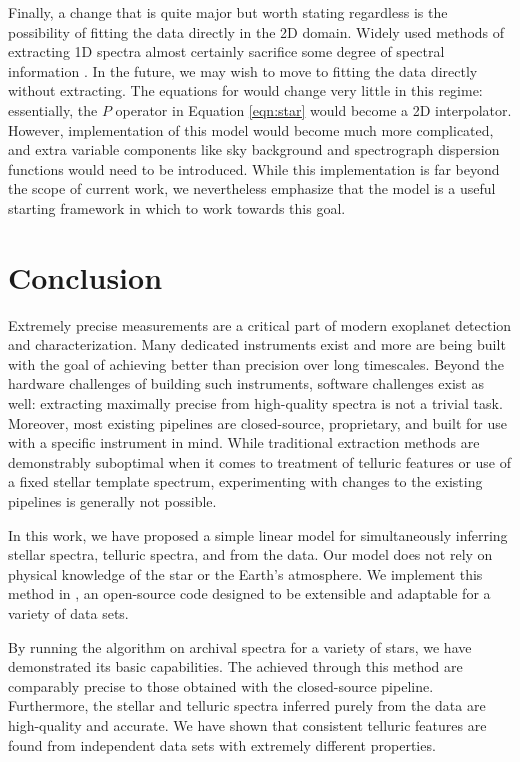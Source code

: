 \documentclass[modern]{aastex62}
\begin{document}
{Finally, a change that is quite major but worth stating regardless is the possibility of fitting the data directly in the 2D domain. 
Widely used methods of extracting 1D spectra almost certainly sacrifice some degree of spectral information \citep{Bolton2010}.
In the future, we may wish to move to fitting the data directly without extracting. 
The equations for \wobble would change very little in this regime: essentially, the $P$ operator in Equation \ref{eqn:star} would become a 2D interpolator. 
However, implementation of this model would become much more complicated, and extra variable components like sky background and spectrograph dispersion functions would need to be introduced. 
While this implementation is far beyond the scope of current work, we nevertheless emphasize that the \wobble model is a useful starting framework in which to work towards this goal.

\section{Conclusion}
\label{s:conclusion}

Extremely precise \RV measurements are a critical part of modern exoplanet detection and characterization. 
Many dedicated \EPRV instruments exist and more are being built with the goal of achieving better than \ms precision over long timescales. 
Beyond the hardware challenges of building such instruments, software challenges exist as well: extracting maximally precise \RVs from high-quality spectra is not a trivial task. 
Moreover, most existing \EPRV pipelines are closed-source, proprietary, and built for use with a specific instrument in mind. 
While traditional \RV extraction methods are demonstrably suboptimal when it comes to treatment of telluric features or use of a fixed stellar template spectrum, experimenting with changes to the existing pipelines is generally not possible.

In this work, we have proposed a simple linear model for simultaneously inferring stellar spectra, telluric spectra, and \RVs from the data. 
Our model does not rely on physical knowledge of the star or the Earth's atmosphere. 
We implement this method in \wobble, an open-source code designed to be extensible and adaptable for a variety of data sets. 

By running the \wobble algorithm on archival \HARPS spectra for a variety of stars, we have demonstrated its basic capabilities. 
The \RVs achieved through this method are comparably precise to those obtained with the closed-source \HARPS pipeline. 
Furthermore, the stellar and telluric spectra inferred purely from the data are high-quality and accurate. 
We have shown that consistent telluric features are found from independent data sets with extremely different properties. 

}
\end{document}
